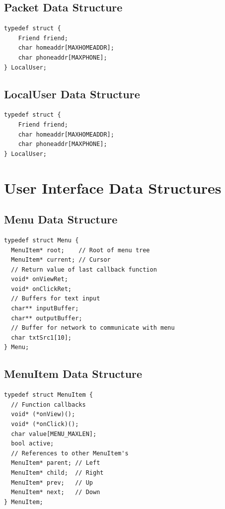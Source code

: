 \documentclass[journal,compsoc]{IEEEtran}
\begin{document}
\subsection{Packet Data Structure}
\label{Packet Data Structure}
\begin{lstlisting}
typedef struct {
	Friend friend;
	char homeaddr[MAXHOMEADDR];
	char phoneaddr[MAXPHONE];
} LocalUser;
\end{lstlisting}

\subsection{LocalUser Data Structure}
\label{LocalUser Data Structure}
\begin{lstlisting}
typedef struct {
	Friend friend;
	char homeaddr[MAXHOMEADDR];
	char phoneaddr[MAXPHONE];
} LocalUser;
\end{lstlisting}

\section{User Interface Data Structures}

\subsection{Menu Data Structure}
\begin{lstlisting}
typedef struct Menu {
  MenuItem* root;    // Root of menu tree
  MenuItem* current; // Cursor
  // Return value of last callback function
  void* onViewRet;
  void* onClickRet;
  // Buffers for text input
  char** inputBuffer;
  char** outputBuffer;
  // Buffer for network to communicate with menu
  char txtSrc1[10]; 
} Menu;
\end{lstlisting}

\subsection{MenuItem Data Structure}
\label{MenuItem Code}
\begin{lstlisting}
typedef struct MenuItem {
  // Function callbacks
  void* (*onView)();
  void* (*onClick)();
  char value[MENU_MAXLEN];
  bool active;
  // References to other MenuItem's
  MenuItem* parent; // Left
  MenuItem* child;  // Right
  MenuItem* prev;   // Up
  MenuItem* next;   // Down
} MenuItem;
\end{lstlisting}


\end{document}
